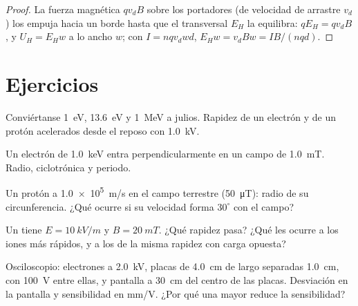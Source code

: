 \begin{proof}
La fuerza magnética $qv_dB$ sobre los portadores (de velocidad de arrastre
$v_d$) los empuja hacia un borde hasta que el  transversal
$E_H$ la equilibra: $qE_H = qv_dB$, y $U_H = E_Hw$ a lo ancho $w$; con
$I = nqv_dwd$, $E_Hw = v_dBw = IB/(nqd)$.
\end{proof}

\section{Ejercicios}

\begin{exercise}[$\star$]\label{exo:b1:charged-particles:1}
Conviértanse \qty{1}{eV}, \qty{13.6}{eV} y \qty{1}{MeV} a julios. Rapidez
de un electrón y de un protón acelerados desde el reposo con \qty{1.0}{kV}.
\end{exercise}

\begin{exercise}[$\star$]\label{exo:b1:charged-particles:2}
Un electrón de \qty{1.0}{keV} entra perpendicularmente en un campo de
\qty{1.0}{mT}. Radio,  ciclotrónica y periodo.
\end{exercise}

\begin{exercise}[$\star$]\label{exo:b1:charged-particles:3}
Un protón a \qty{1.0e5}{m/s} en el campo terrestre (\qty{50}{\micro T}):
radio de su circunferencia. ¿Qué ocurre si su velocidad forma $30^\circ$
con el campo?
\end{exercise}

\begin{exercise}[$\star$]\label{exo:b1:charged-particles:4}
Un  tiene $E = \qty{10}{kV/m}$ y $B = \qty{20}{mT}$.
¿Qué rapidez pasa? ¿Qué les ocurre a los iones más rápidos, y a los de la
misma rapidez con carga opuesta?
\end{exercise}

\begin{exercise}[$\star\star$]\label{exo:b1:charged-particles:5}
Osciloscopio: electrones a \qty{2.0}{kV}, placas de \qty{4.0}{cm} de largo
separadas \qty{1.0}{cm}, con \qty{100}{V} entre ellas, y pantalla a
\qty{30}{cm} del centro de las placas. Desviación en la pantalla y
sensibilidad en mm/V. ¿Por qué una  mayor reduce la
sensibilidad?
\end{exercise}

